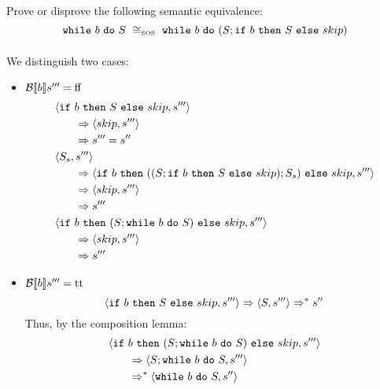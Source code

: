 \begin{exercise}{
    Prove or disprove the following semantic equivalence:
    \[ \wwhile{b}{S}\ \SOScong\ \wwhile{b}{(S;\wif{b}{S}{skip})} \]
}
\begin{itemize}
\begin{itemize}
\begin{itemize}
\begin{align*}
                            \end{align*}
                            We distinguish two cases:
                            \begin{itemize}
                                \item $\mathcal{B} \llbracket b \rrbracket s''' = \text{ff}$
                                    \begin{align*}
                                        &\left<\texttt{if}\ b\ \texttt{then}\ S\ \texttt{else}\ skip, s'''\right>
                                        \\&\qquad\Rightarrow \left<skip, s'''\right>
                                        \\&\qquad\Rightarrow s''' = s''
                                        \\
                                        &\left<S_s, s'''\right>
                                        \\&\qquad\Rightarrow \left<\texttt{if}\ b\ \texttt{then}\ ((S;\texttt{if}\ b\ \texttt{then}\ S\ \texttt{else}\ skip);S_s)\ \texttt{else}\ skip, s'''\right>
                                        \\&\qquad\Rightarrow \left<skip, s'''\right>
                                        \\&\qquad\Rightarrow s'''
                                        \\
                                        &\left<\texttt{if}\ b\ \texttt{then}\ (S; \texttt{while}\ b\ \texttt{do}\ S)\ \texttt{else}\ skip, s'''\right>
                                        \\&\qquad\Rightarrow \left<skip, s'''\right>
                                        \\&\qquad\Rightarrow s'''
                                    \end{align*}
                                \item $\mathcal{B} \llbracket b \rrbracket s''' = \text{tt}$
                                    \[
                                        \left<\texttt{if}\ b\ \texttt{then}\ S\ \texttt{else}\ skip, s'''\right>
                                        \Rightarrow \left<S, s'''\right>
                                        \Rightarrow^* s''
                                    \]
                                    Thus, by the composition lemma:
                                    \begin{align*}
                                        &\instr{\wif{b}{(S; \wwhile{b}{S})}{skip}}{s'''}
                                        \\&\qquad\Rightarrow \instr{S; \wwhile{b}{S}}{s'''}
                                        \\&\qquad\Rightarrow^* \instr{\wwhile{b}{S}}{s''}

\end{align*}
\end{itemize}
\end{itemize}
\end{itemize}
\end{itemize}
\end{exercise}
